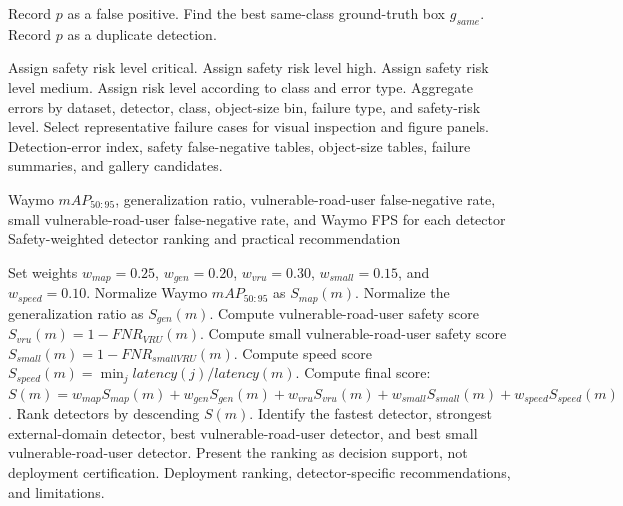 \begin{algorithm}[t]
\begin{algorithmic}[1]
                \STATE Record $p$ as a false positive.
                \STATE Find the best same-class ground-truth box $g_{same}$.
                    \STATE Record $p$ as a duplicate detection.
                \ENDIF
            \ENDFOR

                    \STATE Assign safety risk level critical.
                    \STATE Assign safety risk level high.
                    \STATE Assign safety risk level medium.
                \ELSE
                    \STATE Assign risk level according to class and error type.
                \ENDIF
            \ENDFOR
        \ENDFOR
    \ENDFOR
\ENDFOR
\STATE Aggregate errors by dataset, detector, class, object-size bin, failure type, and safety-risk level.
\STATE Select representative failure cases for visual inspection and figure panels.
\RETURN Detection-error index, safety false-negative tables, object-size tables, failure summaries, and gallery candidates.
\end{algorithmic}
\end{algorithm}


\begin{algorithm}[t]
\caption{Safety-Weighted Deployment Suitability Ranking}
\label{alg:deployment_suitability}
\small
\begin{algorithmic}[1]
\REQUIRE Waymo $mAP_{50:95}$, generalization ratio, vulnerable-road-user false-negative rate, small vulnerable-road-user false-negative rate, and Waymo FPS for each detector
\ENSURE Safety-weighted detector ranking and practical recommendation

\STATE Set weights $w_{map}=0.25$, $w_{gen}=0.20$, $w_{vru}=0.30$, $w_{small}=0.15$, and $w_{speed}=0.10$.
    \STATE Normalize Waymo $mAP_{50:95}$ as $S_{map}(m)$.
    \STATE Normalize the generalization ratio as $S_{gen}(m)$.
    \STATE Compute vulnerable-road-user safety score $S_{vru}(m)=1-FNR_{VRU}(m)$.
    \STATE Compute small vulnerable-road-user safety score $S_{small}(m)=1-FNR_{smallVRU}(m)$.
    \STATE Compute speed score $S_{speed}(m)=\min_j latency(j)/latency(m)$.
    \STATE Compute final score:
    \STATE $S(m)=w_{map}S_{map}(m)+w_{gen}S_{gen}(m)+w_{vru}S_{vru}(m)+w_{small}S_{small}(m)+w_{speed}S_{speed}(m)$.
\ENDFOR
\STATE Rank detectors by descending $S(m)$.
\STATE Identify the fastest detector, strongest external-domain detector, best vulnerable-road-user detector, and best small vulnerable-road-user detector.
\STATE Present the ranking as decision support, not deployment certification.
\RETURN Deployment ranking, detector-specific recommendations, and limitations.
\end{algorithmic}
\end{algorithm}
